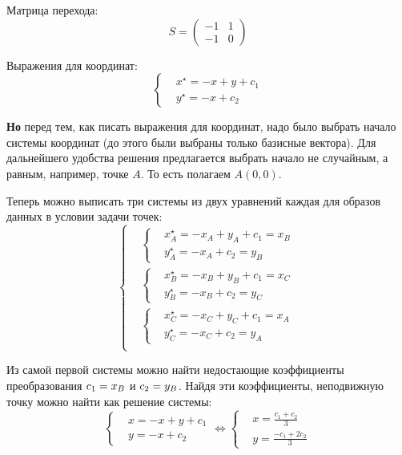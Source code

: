 \documentclass[a4paper,12pt]{article}
\begin{document}
\begin{solution}
    Матрица перехода:
    \[
      S = \begin{pmatrix}-1 & 1\\ -1 & 0\end{pmatrix}
    \]
    
    Выражения для координат:
    \[
      \left\{
        \begin{aligned}
          &x^\star = -x + y + c_1\\
          &y^\star = -x + c_2
        \end{aligned}
      \right.
    \]
    
    \textbf{Но} перед тем, как писать выражения для координат, надо было выбрать начало системы координат (до этого были выбраны только базисные вектора).
    Для дальнейшего удобства решения предлагается выбрать начало не случайным, а равным, например, точке $A$.
    То есть полагаем $A(0, 0)$.
    
    Теперь можно выписать три системы из двух уравнений каждая для образов данных в условии задачи точек:
    \begin{equation}
      \label{eq:huge-system}
      \left\{
        \begin{aligned}
          &\left\{
            \begin{aligned}
              &x_A^\star = -x_A + y_A + c_1 = x_B\\
              &y_A^\star = -x_A + c_2 = y_B
            \end{aligned}
          \right.\\
          &\left\{
            \begin{aligned}
              &x_B^\star = -x_B + y_B + c_1 = x_C\\
              &y_B^\star = -x_B + c_2 = y_C
            \end{aligned}
          \right.\\
          &\left\{
            \begin{aligned}
              &x_C^\star = -x_C + y_C + c_1 = x_A\\
              &y_C^\star = -x_C + c_2 = y_A
            \end{aligned}
          \right.\\
        \end{aligned}
      \right.
    \end{equation}
    
    Из самой первой системы можно найти недостающие коэффициенты преобразования $c_1 \hm= x_B$ и $c_2 \hm= y_B$.
    Найдя эти коэффициенты, неподвижную точку можно найти как решение системы:
    \[
      \left\{
        \begin{aligned}
          &x = -x + y + c_1\\
          &y = -x + c_2
        \end{aligned}
      \right.
      \Leftrightarrow
      \left\{
        \begin{aligned}
          &x = \frac{c_1 + c_2}{3}\\
          &y = \frac{-c_1 + 2c_2}{3}
        \end{aligned}
      \right.
    \]
    

\end{solution}
\end{document}
